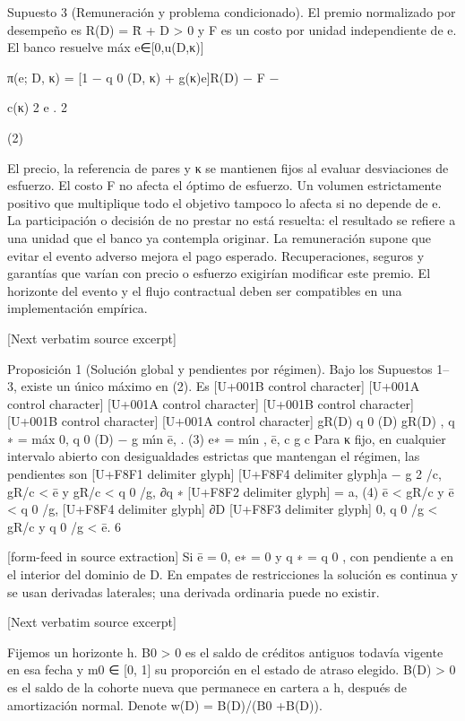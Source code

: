 \documentclass[10pt]{article}
\begin{document}
\begin{ReviewVerbatim}

Supuesto 3 (Remuneración y problema condicionado). El premio normalizado por desempeño es
R(D) = R̄ + D > 0 y F es un costo por unidad independiente de e. El banco resuelve
máx
e∈[0,u(D,κ)]

π(e; D, κ) = [1 − q 0 (D, κ) + g(κ)e]R(D) − F −

c(κ) 2
e .
2

(2)

El precio, la referencia de pares y κ se mantienen ﬁjos al evaluar desviaciones de esfuerzo.
El costo F no afecta el óptimo de esfuerzo. Un volumen estrictamente positivo que multiplique
todo el objetivo tampoco lo afecta si no depende de e. La participación o decisión de no prestar
no está resuelta: el resultado se reﬁere a una unidad que el banco ya contempla originar. La remuneración supone que evitar el evento adverso mejora el pago esperado. Recuperaciones, seguros y
garantías que varían con precio o esfuerzo exigirían modiﬁcar este premio. El horizonte del evento
y el ﬂujo contractual deben ser compatibles en una implementación empírica.

[Next verbatim source excerpt]

Proposición 1 (Solución global y pendientes por régimen). Bajo los Supuestos 1–3, existe un
único máximo en (2). Es
[U+001B control character]
[U+001A control character]
[U+001A control character]
[U+001B control character][U+001B control character]
[U+001A control character]
gR(D)
q 0 (D)
gR(D)
,
q ∗ = máx 0, q 0 (D) − g mı́n ē,
.
(3)
e∗ = mı́n
, ē,
c
g
c
Para κ ﬁjo, en cualquier intervalo abierto con desigualdades estrictas que mantengan el régimen,
las pendientes son
[U+F8F1 delimiter glyph]
[U+F8F4 delimiter glyph]a − g 2 /c, gR/c < ē y gR/c < q 0 /g,
∂q ∗ [U+F8F2 delimiter glyph]
= a,
(4)
ē < gR/c y ē < q 0 /g,
[U+F8F4 delimiter glyph]
∂D
[U+F8F3 delimiter glyph]
0,
q 0 /g < gR/c y q 0 /g < ē.
6


[form-feed in source extraction]
Si ē = 0, e∗ = 0 y q ∗ = q 0 , con pendiente a en el interior del dominio de D. En empates de
restricciones la solución es continua y se usan derivadas laterales; una derivada ordinaria puede
no existir.

[Next verbatim source excerpt]

Fijemos un horizonte h. B0 > 0 es el saldo de créditos antiguos todavía vigente en esa fecha y
m0 ∈ [0, 1] su proporción en el estado de atraso elegido. B(D) > 0 es el saldo de la cohorte nueva
que permanece en cartera a h, después de amortización normal. Denote w(D) = B(D)/(B0 +B(D)).


\end{ReviewVerbatim}
\end{document}
